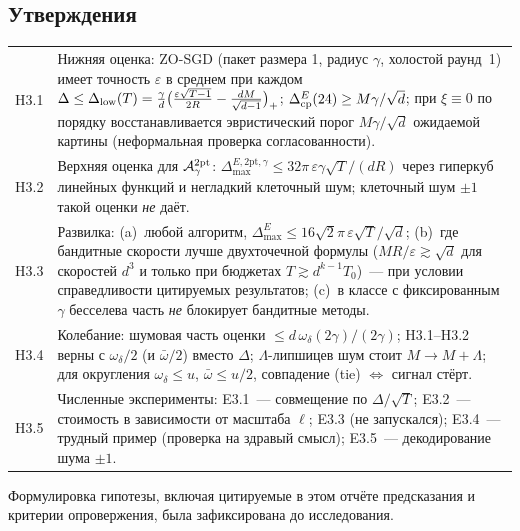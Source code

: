 \documentclass[11pt,a4paper]{article}
\numberwithin{equation}{section}
\theoremstyle{definition}
\theoremstyle{remark}
\newcommand{\Dmax}{\Delta_{\max}}\newcommand{\Dcp}{\Delta_{\rm cp}}\newcommand{\Dlow}{\Delta_{\rm low}}
\newcommand{\wbar}{\bar\omega}\newcommand{\Atwo}{\cA^{\rm 2pt}_\gamma}
\begin{document}
\subsection{Утверждения}
\begin{center}\small
\begin{tabularx}{\textwidth}{@{}lX@{}}
\toprule
H3.1 & Нижняя оценка: ZO-SGD (пакет размера 1, радиус $\gamma$, холостой раунд~1) имеет точность $\varepsilon$ в среднем при каждом $\Delta\le\Dlow(T)=\frac\gamma d\big(\frac{\varepsilon\sqrt{T-1}}{2R}-\frac{dM}{\sqrt{d-1}}\big)_+$; $\Dcp^E(24)\ge M\gamma/\sqrt d$; при $\xi\equiv0$ по порядку восстанавливается эвристический порог $M\gamma/\sqrt d$ ожидаемой картины (неформальная проверка согласованности). \\
H3.2 & Верхняя оценка для $\Atwo$: $\Dmax^{E,\mathrm{2pt},\gamma}\le32\pi\,\varepsilon\gamma\sqrt T/(dR)$ через гиперкуб линейных функций и негладкий клеточный шум; клеточный шум $\pm1$ такой оценки \emph{не} даёт. \\
H3.3 & Развилка: (a)~любой алгоритм, $\Dmax^E\le16\sqrt2\pi\,\varepsilon\sqrt T/\sqrt d$; (b)~где бандитные скорости лучше двухточечной формулы ($MR/\varepsilon\gtrsim\sqrt d$ для скоростей $d^3$ и только при бюджетах $T\gtrsim d^{k-1}T_0$)~--- при условии справедливости цитируемых результатов; (c)~в классе с фиксированным $\gamma$ бесселева часть \emph{не} блокирует бандитные методы. \\
H3.4 & Колебание: шумовая часть оценки $\le d\,\omega_\delta(2\gamma)/(2\gamma)$; H3.1--H3.2 верны с $\omega_\delta/2$ (и $\wbar/2$) вместо $\Delta$; $\Lambda$-липшицев шум стоит $M\to M+\Lambda$; для округления $\omega_\delta\le u$, $\wbar\le u/2$, совпадение (tie) $\Leftrightarrow$ сигнал стёрт. \\
H3.5 & Численные эксперименты: E3.1~--- совмещение по $\Delta/\sqrt T$; E3.2~--- стоимость в зависимости от масштаба $\ell$; E3.3 (не запускался); E3.4~--- трудный пример (проверка на здравый смысл); E3.5~--- декодирование шума $\pm1$. \\
\bottomrule
\end{tabularx}
\end{center}
Формулировка гипотезы, включая цитируемые в этом отчёте предсказания и критерии опровержения, была зафиксирована до исследования.
\end{document}
